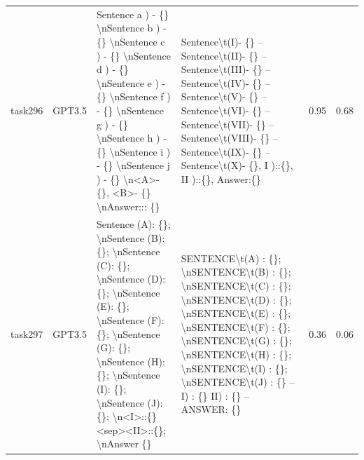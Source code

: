 \begin{longtable}{@{}p{0.8cm\tiny}p{1cm\tiny}p{4.1cm\ttfamily\tiny}p{4.1cm\ttfamily\tiny}p{0.8cm\tiny}p{0.8cm\tiny}@{}}
task296   & GPT3.5    & Sentence a ) - \{\} \textbackslash{}nSentence b ) - \{\} \textbackslash{}nSentence c ) - \{\} \textbackslash{}nSentence d ) - \{\} \textbackslash{}nSentence e ) - \{\} \textbackslash{}nSentence f ) - \{\} \textbackslash{}nSentence g ) - \{\} \textbackslash{}nSentence h ) - \{\} \textbackslash{}nSentence i ) - \{\} \textbackslash{}nSentence j ) - \{\} \textbackslash{}n\textless{}A\textgreater - \{\}, \textless{}B\textgreater - \{\} \textbackslash{}nAnswer::: \{\}                                      & Sentence\textbackslash{}t(I)- \{\} -- Sentence\textbackslash{}t(II)- \{\} -- Sentence\textbackslash{}t(III)- \{\} -- Sentence\textbackslash{}t(IV)- \{\} -- Sentence\textbackslash{}t(V)- \{\} -- Sentence\textbackslash{}t(VI)- \{\} -- Sentence\textbackslash{}t(VII)- \{\} -- Sentence\textbackslash{}t(VIII)- \{\} -- Sentence\textbackslash{}t(IX)- \{\} -- Sentence\textbackslash{}t(X)- \{\}, I )::\{\}, II )::\{\}, Answer:\{\}                                                                                                                                           & 0.95 & 0.68 \\
task297   & GPT3.5    & Sentence  (A): \{\}; \textbackslash{}nSentence  (B): \{\}; \textbackslash{}nSentence  (C): \{\}; \textbackslash{}nSentence  (D): \{\}; \textbackslash{}nSentence  (E): \{\}; \textbackslash{}nSentence  (F): \{\}; \textbackslash{}nSentence  (G): \{\}; \textbackslash{}nSentence  (H): \{\}; \textbackslash{}nSentence  (I): \{\}; \textbackslash{}nSentence  (J): \{\}; \textbackslash{}n\textless{}I\textgreater{}::\{\} \textless{}sep\textgreater \textless{}II\textgreater{}::\{\}; \textbackslash{}nAnswer \{\}  & SENTENCE\textbackslash{}t(A) : \{\}; \textbackslash{}nSENTENCE\textbackslash{}t(B) : \{\}; \textbackslash{}nSENTENCE\textbackslash{}t(C) : \{\}; \textbackslash{}nSENTENCE\textbackslash{}t(D) : \{\}; \textbackslash{}nSENTENCE\textbackslash{}t(E) : \{\}; \textbackslash{}nSENTENCE\textbackslash{}t(F) : \{\}; \textbackslash{}nSENTENCE\textbackslash{}t(G) : \{\}; \textbackslash{}nSENTENCE\textbackslash{}t(H) : \{\}; \textbackslash{}nSENTENCE\textbackslash{}t(I) : \{\}; \textbackslash{}nSENTENCE\textbackslash{}t(J) : \{\} -- I) : \{\} II) : \{\} -- ANSWER: \{\}  & 0.36 & 0.06 \\

\end{longtable}
